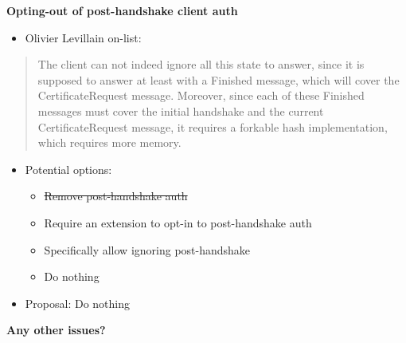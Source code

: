 \documentclass[helvetica]{seminar}
\newcommand{\heading}[1]{%
  \begin{center} 
    \large\bf 
    #1 
  \end{center} 
  \vspace{.4 in}}
\begin{document}
\begin{slide}
\heading{Opting-out of post-handshake client auth}

\vspace{-2ex}
\begin{itemize}
\item Olivier Levillain on-list:
\end{itemize}

{\footnotesize
\begin{quote}
The client can not indeed ignore all this state to answer, since it
is supposed to answer at least with a Finished message, which will cover
the CertificateRequest message. Moreover, since each of these Finished
messages must cover the initial handshake and the current
CertificateRequest message, it requires a forkable hash implementation,
which requires more memory.
\end{quote}
}

\begin{itemize}
\item Potential options:
  \begin{itemize}
  \item \sout{Remove post-handshake auth}
  \item Require an extension to opt-in to post-handshake auth
  \item Specifically allow ignoring post-handshake
  \item Do nothing
  \end{itemize}

\item Proposal: Do nothing
\end{itemize}
\end{slide}


\begin{slide}
\heading{Any other issues?}

\end{slide}
\end{document}

